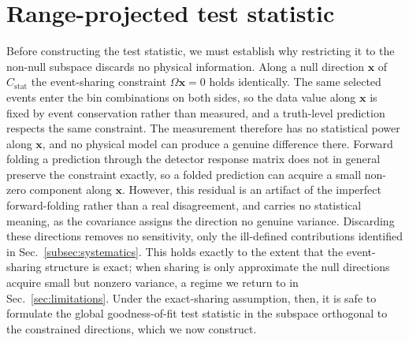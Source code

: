 \documentclass[a4paper,11pt]{article}
\begin{document}
\section{Range-projected  test statistic}
\label{sec:test_statistic}

Before constructing the test statistic, we must establish why restricting it to the non-null subspace discards no physical information. Along a null direction $\mathbf{x}$ of $C_{\text{stat}}$ the event-sharing constraint $\Omega\mathbf{x} = 0$ holds identically. The same selected events enter the bin combinations on both sides, so the data value along $\mathbf{x}$ is fixed by event conservation rather than measured, and a truth-level prediction respects the same constraint. The measurement therefore has no statistical power along $\mathbf{x}$, and no physical model can produce a genuine difference there. Forward folding a prediction through the detector response matrix does not in general preserve the constraint exactly, so a folded prediction can acquire a small non-zero component along $\mathbf{x}$. However, this residual is an artifact of the imperfect forward-folding rather than a real disagreement, and carries no statistical meaning, as the covariance assigns the direction no genuine variance. Discarding these directions removes no sensitivity, only the ill-defined contributions identified in Sec.~\ref{subsec:systematics}. This holds exactly to the extent that the event-sharing structure is exact; when sharing is only approximate the null directions acquire small but nonzero variance, a regime we return to in Sec.~\ref{sec:limitations}. Under the exact-sharing assumption, then, it is safe to formulate the global goodness-of-fit test statistic in the subspace orthogonal to the constrained directions, which we now construct.
\end{document}
